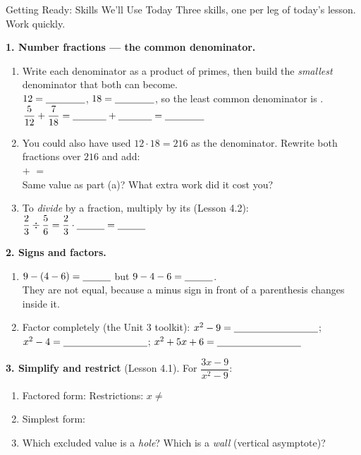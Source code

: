 \documentclass[10pt]{article}
\begin{document}
\namedateperiod

\vspace{0.10in}

\begin{notesbox}{Getting Ready: Skills We'll Use Today}
\small Three skills, one per leg of today's lesson. Work quickly.

\vspace{4pt}
\textbf{1. Number fractions --- the common denominator.}
\begin{enumerate}[label=(\alph*), leftmargin=2.1em, itemsep=3pt]
  \item Write each denominator as a product of primes, then build the \emph{smallest} denominator
        that both can become. \\[2pt]
        $12=\blank{1.4cm}$, \quad $18=\blank{1.4cm}$, \quad so the least common denominator is
        \blank{1.2cm}. \\[3pt]
        $\dfrac{5}{12}+\dfrac{7}{18}=\blank{1.2cm}+\blank{1.2cm}=\blank{1.4cm}$
  \item You could also have used $12\cdot18=216$ as the denominator. Rewrite both fractions over
        $216$ and add: \\[3pt]
        \blank{1.6cm} $+$ \blank{1.6cm} $=$ \blank{1.8cm} \\[3pt]
        Same value as part (a)? \blank{1.0cm} \quad What extra work did it cost you?
        \blank{4.2cm}
  \item To \emph{divide} by a fraction, multiply by its \blank{2.2cm} (Lesson 4.2):
        $\dfrac{2}{3}\div\dfrac{5}{6}=\dfrac{2}{3}\cdot\blank{1.0cm}=\blank{1.0cm}$
\end{enumerate}

\vspace{4pt}
\textbf{2. Signs and factors.}
\begin{enumerate}[label=(\alph*), leftmargin=2.1em, itemsep=3pt]
  \item $9-(4-6)=\blank{1.0cm}$ \qquad but \qquad $9-4-6=\blank{1.0cm}$. \\[2pt]
        They are not equal, because a minus sign in front of a parenthesis changes
        \blank{3.6cm} inside it.
  \item Factor completely (the Unit 3 toolkit): \; $x^2-9=\blank{3.0cm}$; \quad
        $x^2-4=\blank{3.0cm}$; \quad $x^2+5x+6=\blank{3.0cm}$
\end{enumerate}

\vspace{4pt}
\textbf{3. Simplify and restrict} (Lesson 4.1). For $\dfrac{3x-9}{x^2-9}$:
\begin{enumerate}[label=(\alph*), leftmargin=2.1em, itemsep=3pt]
  \item Factored form: \blank{3.6cm} \quad Restrictions: $x\neq$ \blank{1.8cm}
  \item Simplest form: \blank{2.0cm}
  \item Which excluded value is a \emph{hole}? \blank{1.2cm} \; Which is a \emph{wall} (vertical
        asymptote)? \blank{1.2cm}
\end{enumerate}

\end{notesbox}
\end{document}
